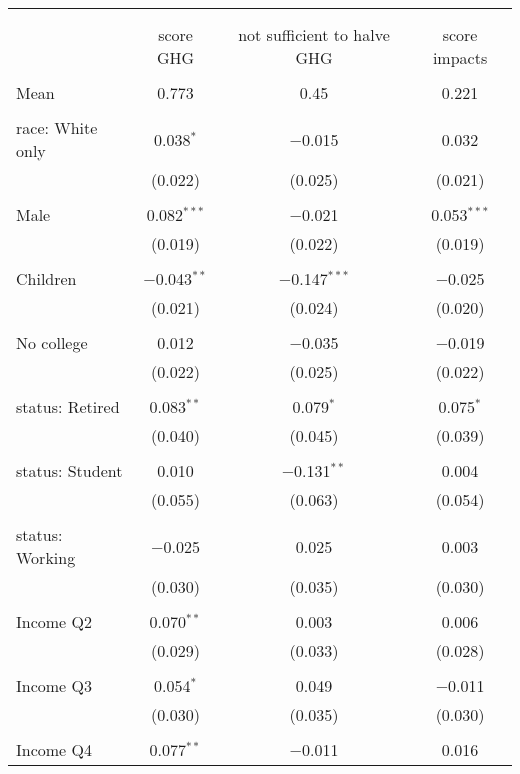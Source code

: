 
\begin{tabular}{@{\extracolsep{5pt}}lccc} 
\\[-1.8ex]\hline 
\hline \\[-1.8ex] 
\\[-1.8ex] & score GHG & not sufficient to halve GHG & score impacts \\ 
\hline \\[-1.8ex] 
 Mean & 0.773 & 0.45 & 0.221  \\ \hline \\[-1.8ex] race: White only & 0.038$^{*}$ & $-$0.015 & 0.032 \\ 
  & (0.022) & (0.025) & (0.021) \\ 
  & & & \\ 
 Male & 0.082$^{***}$ & $-$0.021 & 0.053$^{***}$ \\ 
  & (0.019) & (0.022) & (0.019) \\ 
  & & & \\ 
 Children & $-$0.043$^{**}$ & $-$0.147$^{***}$ & $-$0.025 \\ 
  & (0.021) & (0.024) & (0.020) \\ 
  & & & \\ 
 No college & 0.012 & $-$0.035 & $-$0.019 \\ 
  & (0.022) & (0.025) & (0.022) \\ 
  & & & \\ 
 status: Retired & 0.083$^{**}$ & 0.079$^{*}$ & 0.075$^{*}$ \\ 
  & (0.040) & (0.045) & (0.039) \\ 
  & & & \\ 
 status: Student & 0.010 & $-$0.131$^{**}$ & 0.004 \\ 
  & (0.055) & (0.063) & (0.054) \\ 
  & & & \\ 
 status: Working & $-$0.025 & 0.025 & 0.003 \\ 
  & (0.030) & (0.035) & (0.030) \\ 
  & & & \\ 
 Income Q2 & 0.070$^{**}$ & 0.003 & 0.006 \\ 
  & (0.029) & (0.033) & (0.028) \\ 
  & & & \\ 
 Income Q3 & 0.054$^{*}$ & 0.049 & $-$0.011 \\ 
  & (0.030) & (0.035) & (0.030) \\ 
  & & & \\ 
 Income Q4 & 0.077$^{**}$ & $-$0.011 & 0.016 \\ 

\end{tabular}
